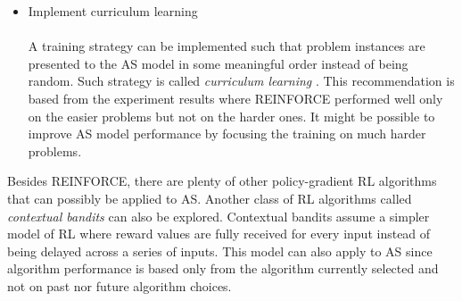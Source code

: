 \begin{itemize}
	\item Implement curriculum learning \\ \\
	A training strategy can be implemented such that problem instances are presented to the AS model in some meaningful order instead of being random. Such strategy is called \textit{curriculum learning} \citep{bengio2009curriculum}. This recommendation is based from the experiment results where REINFORCE performed well only on the easier problems but not on the harder ones. It might be possible to improve AS model performance by focusing the training on much harder problems. 	
\end{itemize}

Besides REINFORCE, there are plenty of other policy-gradient RL algorithms that can possibly be applied to AS. Another class of RL algorithms called \textit{contextual bandits} can also be explored. Contextual bandits assume a simpler model of RL where reward values are fully received for every input instead of being delayed across a series of inputs. This model can also apply to AS since algorithm performance is based only from the algorithm currently selected and not on past nor future algorithm choices.



